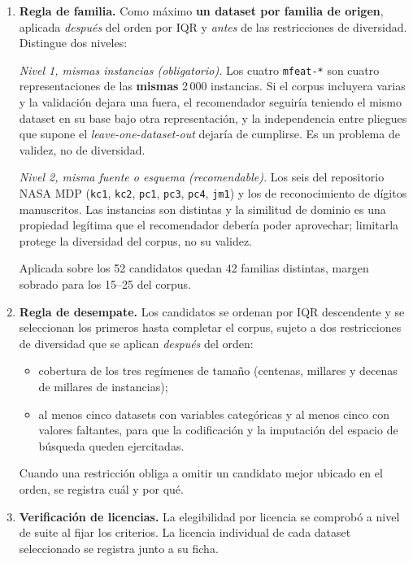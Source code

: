 \documentclass[11pt,letterpaper]{article}
\begin{document}
\begin{enumerate}
  \item \textbf{Regla de familia.} Como máximo \textbf{un dataset por familia de
        origen}, aplicada \emph{después} del orden por IQR y \emph{antes} de las
        restricciones de diversidad. Distingue dos niveles:

        \textit{Nivel 1, mismas instancias (obligatorio).} Los cuatro
        \texttt{mfeat-*} son cuatro representaciones de las \textbf{mismas} 2\,000
        instancias. Si el corpus incluyera varias y la validación dejara una
        fuera, el recomendador seguiría teniendo el mismo dataset en su base bajo
        otra representación, y la independencia entre pliegues que supone el
        \textit{leave-one-dataset-out} dejaría de cumplirse. Es un problema de
        validez, no de diversidad.

        \textit{Nivel 2, misma fuente o esquema (recomendable).} Los seis del
        repositorio NASA MDP (\texttt{kc1}, \texttt{kc2}, \texttt{pc1},
        \texttt{pc3}, \texttt{pc4}, \texttt{jm1}) y los de reconocimiento de
        dígitos manuscritos. Las instancias son distintas y la similitud de
        dominio es una propiedad legítima que el recomendador debería poder
        aprovechar; limitarla protege la diversidad del corpus, no su validez.

        Aplicada sobre los 52 candidatos quedan 42 familias distintas, margen
        sobrado para los 15--25 del corpus.

  \item \textbf{Regla de desempate.} Los candidatos se ordenan por IQR
        descendente y se seleccionan los primeros hasta completar el corpus,
        sujeto a dos restricciones de diversidad que se aplican \emph{después}
        del orden:
        \begin{itemize}
          \item cobertura de los tres regímenes de tamaño (centenas, millares y
                decenas de millares de instancias);
          \item al menos cinco datasets con variables categóricas y al menos
                cinco con valores faltantes, para que la codificación y la
                imputación del espacio de búsqueda queden ejercitadas.
        \end{itemize}
        Cuando una restricción obliga a omitir un candidato mejor ubicado en el
        orden, se registra cuál y por qué.

  \item \textbf{Verificación de licencias.} La elegibilidad por licencia se
        comprobó a nivel de suite al fijar los criterios. La licencia individual
        de cada dataset seleccionado se registra junto a su ficha.


\end{enumerate}
\end{document}

